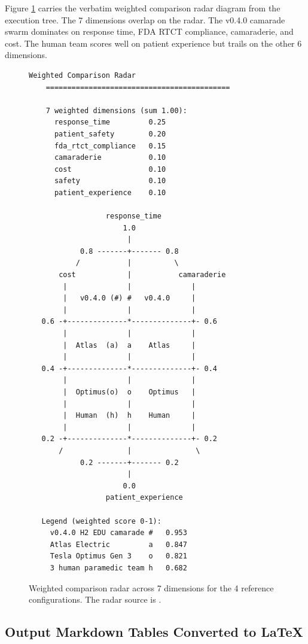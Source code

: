 \begin{sectionaccent}
Figure \ref{fig:comparison-radar} carries the verbatim weighted
comparison radar diagram from the execution tree. The 7 dimensions
overlap on the radar. The v0.4.0 camarade swarm dominates on
response time, FDA RTCT compliance, camaraderie, and cost. The human
team scores well on patient experience but trails on the other 6
dimensions.

\begin{figure}[H]
\centering
\begin{Verbatim}[fontsize=\footnotesize]
    Weighted Comparison Radar
    ===========================================

    7 weighted dimensions (sum 1.00):
      response_time         0.25
      patient_safety        0.20
      fda_rtct_compliance   0.15
      camaraderie           0.10
      cost                  0.10
      safety                0.10
      patient_experience    0.10

                  response_time
                      1.0
                       |
            0.8 -------+------- 0.8
           /           |          \
       cost            |           camaraderie
        |              |              |
        |   v0.4.0 (#) #   v0.4.0     |
        |              |              |
   0.6 -+--------------*--------------+- 0.6
        |              |              |
        |  Atlas  (a)  a    Atlas     |
        |              |              |
   0.4 -+--------------*--------------+- 0.4
        |              |              |
        |  Optimus(o)  o    Optimus   |
        |              |              |
        |  Human  (h)  h    Human     |
        |              |              |
   0.2 -+--------------*--------------+- 0.2
       /               |               \
            0.2 -------+------- 0.2
                       |
                      0.0
                  patient_experience

   Legend (weighted score 0-1):
     v0.4.0 H2 EDU camarade #   0.953
     Atlas Electric         a   0.847
     Tesla Optimus Gen 3    o   0.821
     3 human paramedic team h   0.682
\end{Verbatim}
\caption{Weighted comparison radar across 7 dimensions for the 4 reference configurations. The radar source is .}
\label{fig:comparison-radar}
\end{figure}

\subsection{Output Markdown Tables Converted to LaTeX}
\label{sec:results-tables}


\end{sectionaccent}
